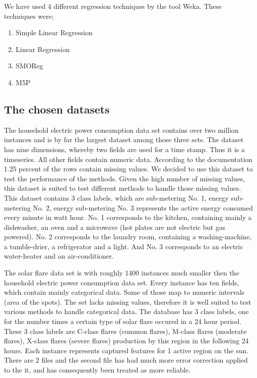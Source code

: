 \documentclass[a4paper]{article}
\begin{document}
We have used 4 different regression techniques by the tool Weka. 
These techniques were;
\begin{enumerate}
    \item Simple Linear Regression
    \item Linear Regression
    \item SMOReg
    \item M5P
\end{enumerate}

\subsection{The chosen datasets}
The household electric power consumption data set contains over two million
instances and is by far the largest dataset among those three sets. The dataset
has nine dimensions, whereby two fields are used for a time stamp. Thus it is a
timeseries. All other fields contain numeric data. According to the
documentation 1.25 percent of the rows contain missing values. We decided to use
this dataset to test the performance of the methods. Given the high number of
missing values, this dataset is suited to test different methods to handle those
missing values. This dataset contains 3 class labels, which are sub-metering No. 1, 
energy sub-metering No. 2,  energy sub-metering No. 3 represents the active energy 
consumed every minute in watt hour. No. 1 corresponds to the kitchen, containing mainly 
a dishwasher, an oven and a microwave (hot plates are not electric but gas powered). 
No. 2 corresponds to the laundry room, containing a washing-machine, a tumble-drier, 
a refrigerator and a light. And No. 3 corresponds to an electric water-heater and an air-conditioner. 

The solar flare data set is with roughly 1400 instances much smaller then the
household electric power consumption data set. Every instance has ten fields,
which contain mainly categorical data. Some of those map to numeric intervals
(area of the spots). The set lacks missing values, therefore it is well suited
to test various methods to handle categorical data. The database has 3 class labels, 
one for the number times a certain type of solar flare occured in a 24 hour period. 
These 3 class labels are C-class flares (common flares), M-class flares (moderate flares), 
X-class flares (severe flares) production by this region in the following 24 hours. 
Each instance represents captured features for 1 active region on the sun. 
There are 2 files and the second file has had much more error correction applied to the it, 
and has consequently been treated as more reliable. 
\end{document}
